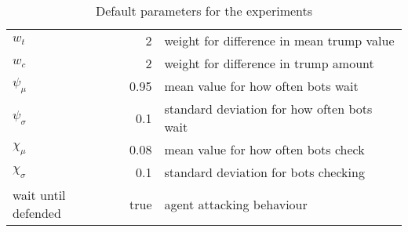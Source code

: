 \documentclass[a4paper,titlepage]{article}
\begin{document}
\begin{table}[h]
\begin{tabular}{lrl}
    $w_t$ & 2 & weight for difference in mean trump value \\
    $w_c$ & 2 & weight for difference in trump amount \\
    $\psi_\mu$ & 0.95 & mean value for how often bots wait \\
    $\psi_\sigma$ & 0.1 & standard deviation for how often bots wait \\
    $\chi_\mu$ & 0.08 & mean value for how often bots check \\
    $\chi_\sigma$ & 0.1 & standard deviation for bots checking \\
    wait until defended & true & agent attacking behaviour \\
    \bottomrule
  \end{tabular}
  \caption{Default parameters for the experiments}
  \label{table:parameters}
\end{table}

\newpage
\end{document}
